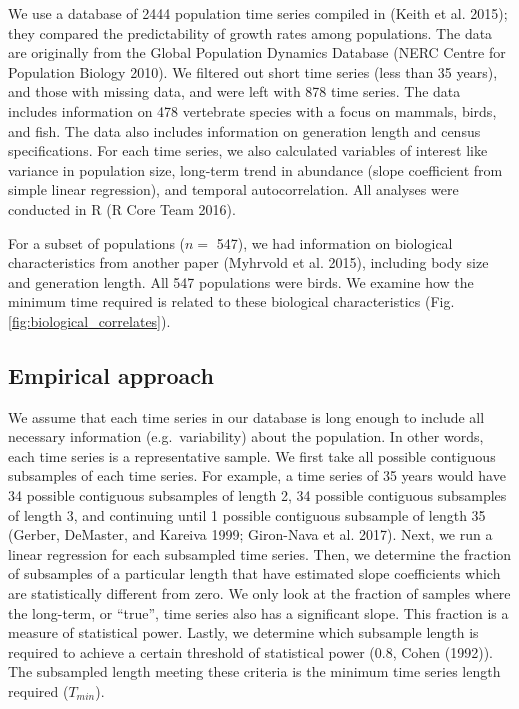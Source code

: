 \documentclass[12pt,]{article}
\begin{document}
We use a database of 2444 population time series compiled in (Keith et
al. 2015); they compared the predictability of growth rates among
populations. The data are originally from the Global Population Dynamics
Database (NERC Centre for Population Biology 2010). We filtered out
short time series (less than 35 years), and those with missing data, and
were left with 878 time series. The data includes information on 478
vertebrate species with a focus on mammals, birds, and fish. The data
also includes information on generation length and census
specifications. For each time series, we also calculated variables of
interest like variance in population size, long-term trend in abundance
(slope coefficient from simple linear regression), and temporal
autocorrelation. All analyses were conducted in R (R Core Team 2016).

For a subset of populations (\(n =\) 547), we had information on
biological characteristics from another paper (Myhrvold et al. 2015),
including body size and generation length. All 547 populations were
birds. We examine how the minimum time required is related to these
biological characteristics (Fig. \ref{fig:biological_correlates}).

\subsection{Empirical approach}\label{empirical-approach}

We assume that each time series in our database is long enough to
include all necessary information (e.g.~variability) about the
population. In other words, each time series is a representative sample.
We first take all possible contiguous subsamples of each time series.
For example, a time series of 35 years would have 34 possible contiguous
subsamples of length 2, 34 possible contiguous subsamples of length 3,
and continuing until 1 possible contiguous subsample of length 35
(Gerber, DeMaster, and Kareiva 1999; Giron-Nava et al. 2017). Next, we
run a linear regression for each subsampled time series. Then, we
determine the fraction of subsamples of a particular length that have
estimated slope coefficients which are statistically different from
zero. We only look at the fraction of samples where the long-term, or
``true'', time series also has a significant slope. This fraction is a
measure of statistical power. Lastly, we determine which subsample
length is required to achieve a certain threshold of statistical power
(0.8, Cohen (1992)). The subsampled length meeting these criteria is the
minimum time series length required (\(T_{min}\)).
\end{document}
